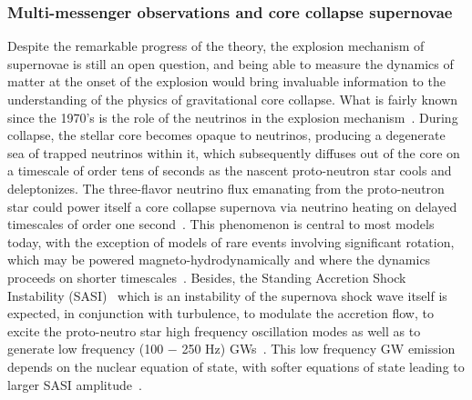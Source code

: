 \subsubsection{Multi-messenger observations and core collapse supernovae}

Despite the remarkable progress of the theory, the explosion mechanism of supernovae is still an open question, and being able to measure the dynamics of matter at the onset of the explosion would bring invaluable information to the understanding of the physics of gravitational core collapse. 
What is fairly known since the 1970's is the role of the neutrinos in the explosion mechanism~\cite{CoWh66,Wilson74}. During collapse, the stellar core becomes opaque to neutrinos, producing a degenerate sea of trapped neutrinos within it, which subsequently diffuses out of the core on a timescale of order tens of seconds as the nascent proto-neutron star  cools and deleptonizes.
The three-flavor neutrino flux emanating from the proto-neutron star could power itself a core collapse supernova via neutrino heating on delayed timescales of order one second~\cite{JaMu96,mezz:98,MuJaMa12,MuJaHe12,takiwaki:12,hanke_13,murphy:13,CoOt13,cerda_13,MuMeHe17,radice:17,OcCo18,Powell:2018isq}.
This phenomenon is central to most models today, with the exception of models of rare events involving significant rotation, which may be powered magneto-hydrodynamically and where the dynamics proceeds  on shorter timescales~\cite{ZwMu97,DiFoMu01,DiFoMu02,dimmelmeier:07,ott:07,dimmelmeier:08,kuroda:14,yakunin:15,kuroda:16,andresen:17}.
Besides, the Standing Accretion Shock Instability (SASI)~\cite{blondin:03,foglizzo:07} which is an instability of the supernova shock wave itself is expected, in conjunction with turbulence, to modulate the accretion flow, to excite the proto-neutro star high frequency oscillation modes as well as to generate low frequency (100 $-$ 250 Hz) GWs~\cite{MuRaBu04,kuroda:16,andresen:17}. This low frequency GW emission depends on the nuclear equation of state, with softer equations of state leading to larger SASI amplitude~\cite{kuroda:16}.   

